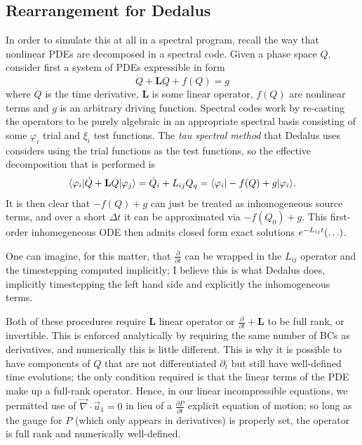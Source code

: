 \documentclass[11pt,
        usenames, %
        dvipsnames %
    ]{report}
\newcommand*{\pd}[2]{\frac{\partial#1}{\partial#2}}
\newcommand*{\bm}[1]{\boldsymbol{\mathbf{#1}}}
\DeclarePairedDelimiter\bra{\langle}{\rvert}
\DeclarePairedDelimiter\ket{\lvert}{\rangle}
\DeclarePairedDelimiter\p{\lparen}{\rparen}
\begin{document}
\subsection{Rearrangement for Dedalus}

In order to simulate this at all in a spectral program, recall the way that
nonlinear PDEs are decomposed in a spectral code. Given a phase space $Q$,
consider first a system of PDEs expressible in form
\begin{equation}
    \dot{Q} + \bm{L}Q + f(Q) = g
\end{equation}
where $\dot{Q}$ is the time derivative, $\bm{L}$ is some linear operator, $f(Q)$
are nonlinear terms and $g$ is an arbitrary driving function. Spectral codes
work by re-casting the operators to be purely algebraic in an appropriate
spectral basis consisting of some $\varphi_i$ trial and $\xi_i$ test functions.
The \emph{tau spectral method} that Dedalus uses considers using the trial
functions as the test functions, so the effective decomposition that is
performed is
\begin{equation}
    \bra*{\varphi_i}\dot{Q} + \bm{L}Q \ket*{\varphi_j}
        = \dot{Q}_i + L_{ij}Q_q = \bra*{\varphi_i}-f(Q)  + g \ket*{\varphi_i}.
\end{equation}
It is then clear that $-f(Q) + g$ can just be treated as inhomogeneous source
terms, and over a short $\Delta t$ it can be approximated via $-f(Q_0) + g$.
This first-order inhomegeneous ODE then admits closed form exact solutions
$e^{-L_{ij}t}\p*{\dots}$.

One can imagine, for this matter, that $\pd{}{t}$ can be wrapped in the $L_{ij}$
operator and the timestepping computed implicitly; I believe this is what
Dedalus does, implicitly timestepping the left hand side and explicitly the
inhomogeneous terms.

Both of these procedures require $\bm{L}$ linear operator or $\pd{}{t} + \bm{L}$
to be full rank, or invertible. This is enforced analytically by requiring the
same number of BCs as derivatives, and numerically this is little different.
This is why it is possible to have components of $Q$ that are not differentiated
$\partial_t$ but still have well-defined time evolutions; the only condition
required is that the linear terms of the PDE make up a full-rank operator.
Hence, in our linear incompressible equations, we permitted use of $\vec{\nabla}
\cdot \vec{u}_1 = 0$ in lieu of a $\pd{P}{t}$ explicit equation of motion; so
long as the gauge for $P$ (which only appears in derivatives) is properly set,
the operator is full rank and numerically well-defined.
\end{document}
